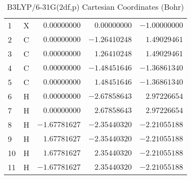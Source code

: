 \documentclass[10pt,oneside]{article}
\begin{document}
\begin{table}[h]
\centering
\caption{B3LYP/6-31G(2df,p) Cartesian Coordinates (Bohr)}
\begin{tabular}{llrrr}
\toprule
1  & X  & $ 0.00000000$ & $ 0.00000000$ & $-1.00000000$ \\
2  & C  & $ 0.00000000$ & $-1.26410248$ & $ 1.49029461$ \\
3  & C  & $ 0.00000000$ & $ 1.26410248$ & $ 1.49029461$ \\
4  & C  & $ 0.00000000$ & $-1.48451646$ & $-1.36861340$ \\
5  & C  & $ 0.00000000$ & $ 1.48451646$ & $-1.36861340$ \\
6  & H  & $ 0.00000000$ & $-2.67858643$ & $ 2.97226654$ \\
7  & H  & $ 0.00000000$ & $ 2.67858643$ & $ 2.97226654$ \\
8  & H  & $-1.67781627$ & $-2.35440320$ & $-2.21055188$ \\
9  & H  & $ 1.67781627$ & $-2.35440320$ & $-2.21055188$ \\
10 & H  & $ 1.67781627$ & $ 2.35440320$ & $-2.21055188$ \\
11 & H  & $-1.67781627$ & $ 2.35440320$ & $-2.21055188$ \\
\bottomrule
\end{tabular}
\end{table}
\end{document}
